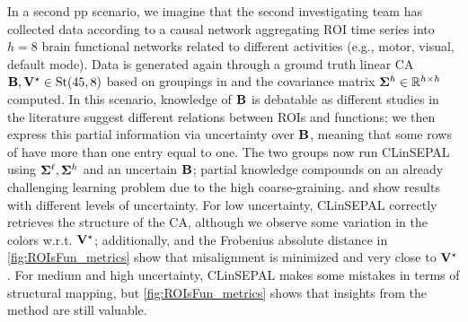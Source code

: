 In a second pp scenario, we imagine that the second investigating team has collected data according to a causal network aggregating ROI time series into $h=8$ brain functional networks related to different activities (e.g., motor, visual, default mode). Data is generated again through a ground truth linear CA $\mathbf{B}, \mathbf{V}^\star \in \mathrm{St}({45},{8})$ based on groupings in \cite{gabriele2024extracting} and the covariance matrix $\boldsymbol{\Sigma}^{h} \in \mathbb{R}^{h \times h}$ computed. In this scenario, knowledge of $\mathbf{B}$ is debatable as different studies in the literature suggest different relations between ROIs and functions; we then express this partial information via uncertainty over $\mathbf{B}$, meaning that some rows of \B have more than one entry equal to one. The two groups now run CLinSEPAL using $\boldsymbol{\Sigma}^{\ell},\boldsymbol{\Sigma}^{h}$ and an uncertain $\mathbf{B}$; partial knowledge compounds on an already challenging learning problem due to the high coarse-graining.  and  show results with different levels of uncertainty. For low uncertainty, CLinSEPAL correctly retrieves the structure of the CA, although we observe some variation in the colors w.r.t. $\mathbf{V}^\star$; additionally, \KL{\Vhat} and the Frobenius absolute distance in \cref{fig:ROIsFun_metrics} show that misalignment is minimized and \Vhat very close to $\mathbf{V}^\star$. For medium and high uncertainty, CLinSEPAL makes some mistakes in terms of structural mapping, but \cref{fig:ROIsFun_metrics} shows that insights from the method are still valuable.